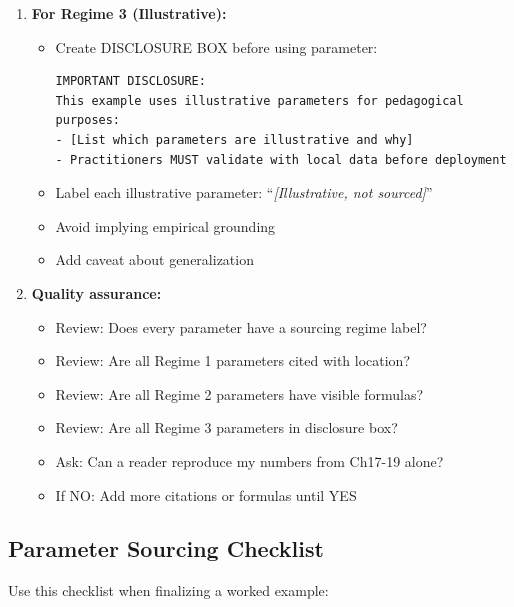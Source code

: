 \begin{enumerate}
\item \textbf{For Regime 3 (Illustrative):}
\begin{itemize}[nosep]
\item Create DISCLOSURE BOX before using parameter:
\begin{verbatim}
IMPORTANT DISCLOSURE:
This example uses illustrative parameters for pedagogical purposes:
- [List which parameters are illustrative and why]
- Practitioners MUST validate with local data before deployment
\end{verbatim}
\item Label each illustrative parameter: ``\textit{[Illustrative, not sourced]}''
\item Avoid implying empirical grounding
\item Add caveat about generalization
\end{itemize}

\item \textbf{Quality assurance:}
\begin{itemize}[nosep]
\item Review: Does every parameter have a sourcing regime label?
\item Review: Are all Regime 1 parameters cited with location?
\item Review: Are all Regime 2 parameters have visible formulas?
\item Review: Are all Regime 3 parameters in disclosure box?
\item Ask: Can a reader reproduce my numbers from Ch17-19 alone?
\item If NO: Add more citations or formulas until YES
\end{itemize}

\end{enumerate}

\subsection{Parameter Sourcing Checklist}
\label{subsec:jjj-checklist}

Use this checklist when finalizing a worked example:

